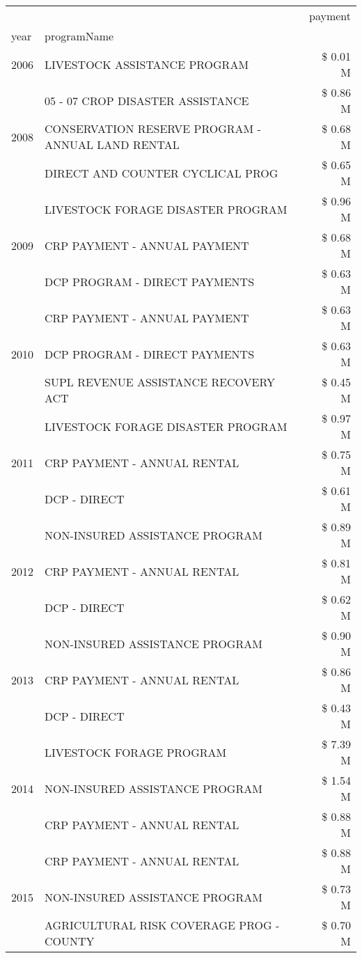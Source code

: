 \begin{tabular}{llr}
\toprule
 &  & payment \\
year & programName &  \\
\midrule
2006 & LIVESTOCK ASSISTANCE PROGRAM & \$ 0.01 M \\
\cline{1-3}
\multirow[t]{3}{*}{2008} & 05 - 07 CROP DISASTER ASSISTANCE & \$ 0.86 M \\
 & CONSERVATION RESERVE PROGRAM - ANNUAL LAND RENTAL & \$ 0.68 M \\
 & DIRECT AND COUNTER CYCLICAL PROG & \$ 0.65 M \\
\cline{1-3}
\multirow[t]{3}{*}{2009} & LIVESTOCK FORAGE DISASTER  PROGRAM & \$ 0.96 M \\
 & CRP PAYMENT - ANNUAL PAYMENT & \$ 0.68 M \\
 & DCP PROGRAM - DIRECT PAYMENTS & \$ 0.63 M \\
\cline{1-3}
\multirow[t]{3}{*}{2010} & CRP PAYMENT - ANNUAL PAYMENT & \$ 0.63 M \\
 & DCP PROGRAM - DIRECT PAYMENTS & \$ 0.63 M \\
 & SUPL REVENUE ASSISTANCE RECOVERY ACT & \$ 0.45 M \\
\cline{1-3}
\multirow[t]{3}{*}{2011} & LIVESTOCK FORAGE DISASTER PROGRAM & \$ 0.97 M \\
 & CRP PAYMENT - ANNUAL RENTAL & \$ 0.75 M \\
 & DCP - DIRECT & \$ 0.61 M \\
\cline{1-3}
\multirow[t]{3}{*}{2012} & NON-INSURED ASSISTANCE PROGRAM & \$ 0.89 M \\
 & CRP PAYMENT - ANNUAL RENTAL & \$ 0.81 M \\
 & DCP - DIRECT & \$ 0.62 M \\
\cline{1-3}
\multirow[t]{3}{*}{2013} & NON-INSURED ASSISTANCE PROGRAM & \$ 0.90 M \\
 & CRP PAYMENT - ANNUAL RENTAL & \$ 0.86 M \\
 & DCP - DIRECT & \$ 0.43 M \\
\cline{1-3}
\multirow[t]{3}{*}{2014} & LIVESTOCK FORAGE PROGRAM & \$ 7.39 M \\
 & NON-INSURED ASSISTANCE PROGRAM & \$ 1.54 M \\
 & CRP PAYMENT - ANNUAL RENTAL & \$ 0.88 M \\
\cline{1-3}
\multirow[t]{3}{*}{2015} & CRP PAYMENT - ANNUAL RENTAL & \$ 0.88 M \\
 & NON-INSURED ASSISTANCE PROGRAM & \$ 0.73 M \\
 & AGRICULTURAL RISK COVERAGE PROG - COUNTY & \$ 0.70 M \\

\end{tabular}
